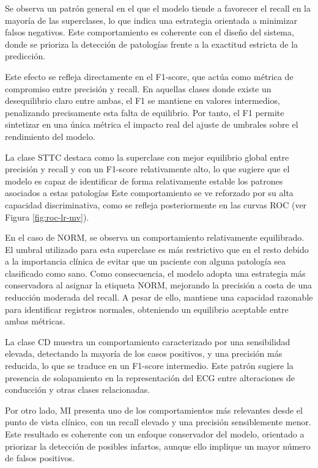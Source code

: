 \documentclass[12pt,a4paper,twoside]{book}
\begin{document}
Se observa un patrón general en el que el modelo tiende a favorecer el recall en la mayoría de las superclases, lo que indica una estrategia orientada a minimizar falsos negativos. 
Este comportamiento es coherente con el diseño del sistema, donde se prioriza la detección de patologías frente a la exactitud estricta de la predicción.

Este efecto se refleja directamente en el F1-score, que actúa como métrica de compromiso entre precisión y recall. 
En aquellas clases donde existe un desequilibrio claro entre ambas, el F1 se mantiene en valores intermedios, penalizando precisamente esta falta de equilibrio. 
Por tanto, el F1 permite sintetizar en una única métrica el impacto real del ajuste de umbrales sobre el rendimiento del modelo.

La clase STTC destaca como la superclase con mejor equilibrio global entre precisión y recall y con un F1-score relativamente alto, lo que sugiere que el modelo es capaz de identificar de forma relativamente estable los patrones asociados a estas patologías
Este comportamiento se ve reforzado por su alta capacidad discriminativa, como se refleja posteriormente en las curvas ROC (ver Figura \ref{fig:roc-lr-mv}).

En el caso de NORM, se observa un comportamiento relativamente equilibrado. 
El umbral utilizado para esta superclase es más restrictivo que en el resto debido a la importancia clínica de evitar que un paciente con alguna patología sea clasificado como sano. 
Como consecuencia, el modelo adopta una estrategia más conservadora al asignar la etiqueta NORM, mejorando la precisión a costa de una reducción moderada del recall. 
A pesar de ello, mantiene una capacidad razonable para identificar registros normales, obteniendo un equilibrio aceptable entre ambas métricas.

La clase CD muestra un comportamiento caracterizado por una sensibilidad elevada, detectando la mayoría de los casos positivos, y una precisión más reducida, lo que se traduce en un F1-score intermedio. 
Este patrón sugiere la presencia de solapamiento en la representación del ECG entre alteraciones de conducción y otras clases relacionadas.

Por otro lado, MI presenta uno de los comportamientos más relevantes desde el punto de vista clínico, con un recall elevado y una precisión sensiblemente menor. 
Este resultado es coherente con un enfoque conservador del modelo, orientado a priorizar la detección de posibles infartos, aunque ello implique un mayor número de falsos positivos.
\end{document}
